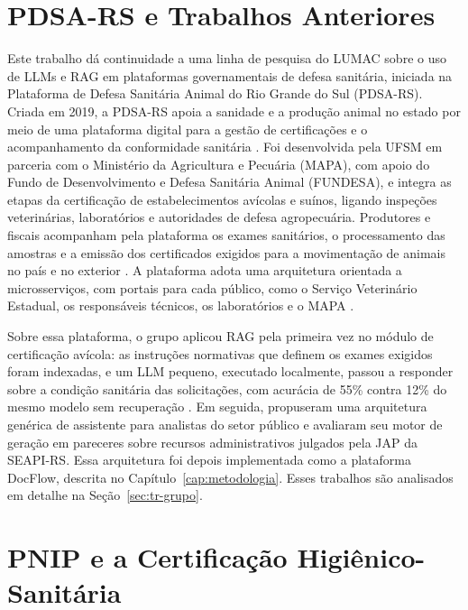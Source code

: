 \section{PDSA-RS e Trabalhos Anteriores}
\label{sec:pdsa}

Este trabalho dá continuidade a uma linha de pesquisa do LUMAC sobre o uso de LLMs e RAG em plataformas governamentais de defesa sanitária, iniciada na Plataforma de Defesa Sanitária Animal do Rio Grande do Sul (PDSA-RS). Criada em 2019, a PDSA-RS apoia a sanidade e a produção animal no estado por meio de uma plataforma digital para a gestão de certificações e o acompanhamento da conformidade sanitária \cite{Montero2025}. Foi desenvolvida pela UFSM em parceria com o Ministério da Agricultura e Pecuária (MAPA), com apoio do Fundo de Desenvolvimento e Defesa Sanitária Animal (FUNDESA), e integra as etapas da certificação de estabelecimentos avícolas e suínos, ligando inspeções veterinárias, laboratórios e autoridades de defesa agropecuária. Produtores e fiscais acompanham pela plataforma os exames sanitários, o processamento das amostras e a emissão dos certificados exigidos para a movimentação de animais no país e no exterior \cite{Montero2025}. A plataforma adota uma arquitetura orientada a microsserviços, com portais para cada público, como o Serviço Veterinário Estadual, os responsáveis técnicos, os laboratórios e o MAPA \cite{Montero2025}.

Sobre essa plataforma, o grupo aplicou RAG pela primeira vez no módulo de certificação avícola: as instruções normativas que definem os exames exigidos foram indexadas, e um LLM pequeno, executado localmente, passou a responder sobre a condição sanitária das solicitações, com acurácia de 55\% contra 12\% do mesmo modelo sem recuperação \cite{Montero2025iceis,Montero2025}. Em seguida,  propuseram uma arquitetura genérica de assistente para analistas do setor público e avaliaram seu motor de geração em pareceres sobre recursos administrativos julgados pela JAP da SEAPI-RS. Essa arquitetura foi depois implementada como a plataforma DocFlow, descrita no Capítulo~\ref{cap:metodologia}. Esses trabalhos são analisados em detalhe na Seção~\ref{sec:tr-grupo}.

\section{PNIP e a Certificação Higiênico-Sanitária}
\label{sec:pnip}

